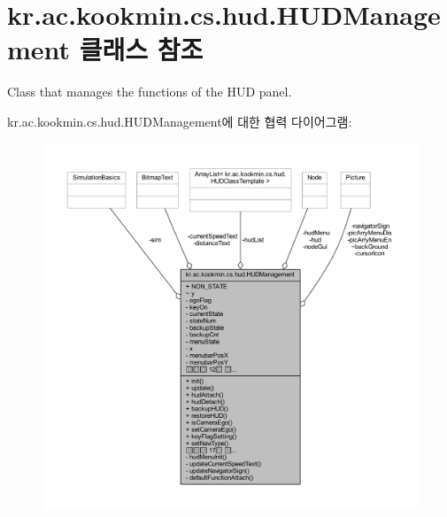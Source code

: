 \hypertarget{classkr_1_1ac_1_1kookmin_1_1cs_1_1hud_1_1_h_u_d_management}{}\section{kr.\+ac.\+kookmin.\+cs.\+hud.\+H\+U\+D\+Management 클래스 참조}
\label{classkr_1_1ac_1_1kookmin_1_1cs_1_1hud_1_1_h_u_d_management}


Class that manages the functions of the H\+U\+D panel.  




kr.\+ac.\+kookmin.\+cs.\+hud.\+H\+U\+D\+Management에 대한 협력 다이어그램\+:\nopagebreak
\begin{figure}[H]
\begin{center}
\leavevmode
\includegraphics[width=350pt]{classkr_1_1ac_1_1kookmin_1_1cs_1_1hud_1_1_h_u_d_management__coll__graph}
\end{center}
\end{figure}
